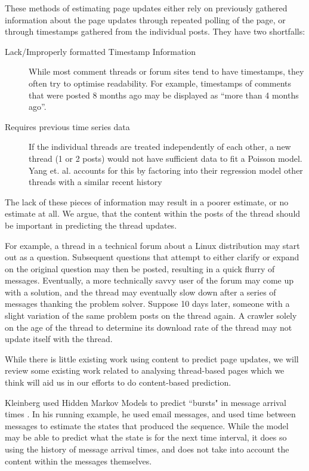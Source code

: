 \documentclass[12 pt]{article}
\begin{document}
These methods of estimating page updates either rely on previously gathered information about the page updates through repeated polling of the page, or through timestamps gathered from the individual posts. They have two shortfalls:

\begin{description}
	\item[Lack/Improperly formatted Timestamp Information] While most comment threads or forum sites tend to have timestamps, they often try to optimise readability. For example, timestamps of comments that were posted 8 months ago may be displayed as ``more than 4 months ago''.
	\item[Requires previous time series data]
		If the individual threads are treated independently of each other, a new thread (1 or 2 posts) would not have sufficient data to fit a Poisson model. Yang et. al. \cite{Yang2009} accounts for this by factoring into their regression model other threads with a similar recent history
\end{description}
The lack of these pieces of information may result in a poorer estimate, or no estimate at all. We argue, that the content within the posts of the thread should be important in predicting the thread updates.

For example, a thread in a technical forum about a Linux distribution may start out as a question. Subsequent questions that attempt to either clarify or expand on the original question may then be posted, resulting in a quick flurry of messages. Eventually, a more technically savvy user of the forum may come up with a solution, and the thread may eventually slow down after a series of messages thanking the problem solver. Suppose 10 days later, someone with a slight variation of the same problem posts on the thread again. A crawler solely on the age of the thread to determine its download rate of the thread may not update itself with the thread.

While there is little existing work using content to predict page updates, we will review some existing work related to analysing thread-based pages which we think will aid us in our efforts to do content-based prediction.

Kleinberg used Hidden Markov Models to predict ``bursts" in message arrival times \cite{Kleinberg2003}. In his running example, he used email messages, and used time between messages to estimate the states that produced the sequence. While the model may be able to predict what the state is for the next time interval, it does so using the history of message arrival times, and does not take into account the content within the messages themselves.
\end{document}
